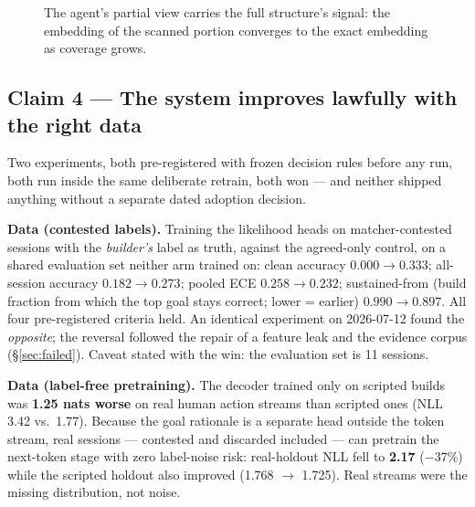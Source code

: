 \documentclass[11pt]{article}
\begin{document}
\begin{figure}[ht]
\centering
{}
\caption{The agent's partial view carries the full structure's signal: the
embedding of the scanned portion converges to the exact embedding as coverage
grows.}
\label{fig:scan}
\end{figure}

\subsection{Claim 4 --- The system improves lawfully with the right data}
\label{sec:claim4}

Two experiments, both pre-registered with frozen decision rules before any run,
both run inside the same deliberate retrain, both won --- and neither shipped
anything without a separate dated adoption decision.

\textbf{Data (contested labels).} Training the likelihood heads on
matcher-contested sessions with the \emph{builder's} label as truth, against
the agreed-only control, on a shared evaluation set neither arm trained on:
clean accuracy $0.000 \to 0.333$; all-session accuracy $0.182 \to 0.273$;
pooled ECE $0.258 \to 0.232$; sustained-from (build fraction from which the
top goal stays correct; lower = earlier) $0.990 \to 0.897$. All four
pre-registered criteria held. An identical experiment on 2026-07-12 found the
\emph{opposite}; the reversal followed the repair of a feature leak and the
evidence corpus (\S\ref{sec:failed}). Caveat stated with the win: the
evaluation set is 11 sessions.

\textbf{Data (label-free pretraining).} The decoder trained only on scripted
builds was \textbf{1.25 nats worse} on real human action streams than scripted
ones (NLL 3.42 vs.\ 1.77). Because the goal rationale is a separate head
outside the token stream, real sessions --- contested and discarded included
--- can pretrain the next-token stage with zero label-noise risk: real-holdout
NLL fell to \textbf{2.17} ($-37\%$) while the scripted holdout also improved
(1.768 $\to$ 1.725). Real streams were the missing distribution, not noise.
\end{document}
